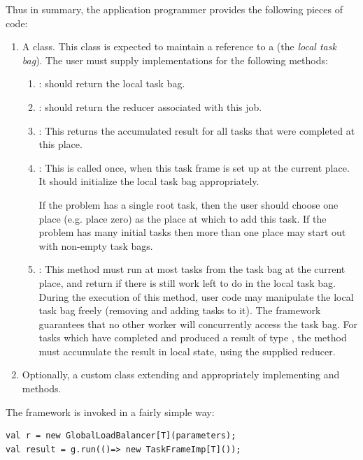 Thus in summary, the application programmer provides the following
pieces of code:
\begin{enumerate}
\item A  class. This class is expected to maintain a
  reference to a  (the {\em local task bag}). The user
  must supply implementations for the following methods:
  \begin{enumerate}
  \item   {}: should return the local task bag.
  \item {}: should return the reducer
    associated with this job.
  \item {}: This returns the accumulated result for all
    tasks that were completed at this place. 
  \item {}: This is called once, when this task
    frame is set up at the current place. It should initialize the
    local task bag appropriately. 

    If the problem has a single root task, then the user should choose
    one place (e.g. place zero) as the place at which to add this
    task. If the problem has many initial tasks then more than one
    place may start out with non-empty task bags. 
  \item {}: This method must run at most
     tasks from the task bag at the current place, and return
     if there is still work left to do in the local task
    bag. During the execution of this method, user code may manipulate
    the local task bag freely (removing and adding tasks to it). The
    framework guarantees that no other worker will concurrently access
    the task bag. For tasks which have completed and produced a result
    of type , the method must accumulate the result in local
    state, using the supplied reducer.
\end{enumerate}
\item Optionally, a custom class extending  and
  appropriately implementing  and  methods. 
\end{enumerate}

The framework is invoked in a fairly simple way:

{\footnotesize
\begin{verbatim}
val r = new GlobalLoadBalancer[T](parameters);
val result = g.run(()=> new TaskFrameImp[T]());
\end{verbatim}}

